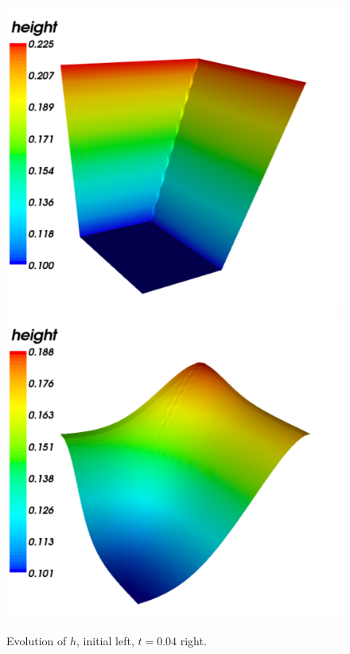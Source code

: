 \begin{figure}
\bwfig
  \centering
  \includegraphics[width=\twofigs]{chapters/schroll/pdf/h0_typical.pdf}
  \includegraphics[width=\twofigs]{chapters/schroll/pdf/h_typical.pdf}
  \caption{Evolution of $h$, initial left, $t=0.04$ right.}
  \label{fig1}
\end{figure}

